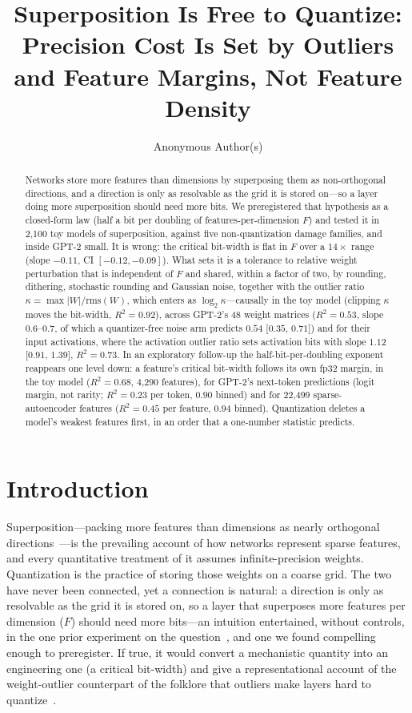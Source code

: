 \documentclass{article}
\title{Superposition Is Free to Quantize: Precision Cost Is Set by Outliers and Feature Margins, Not Feature Density}
\author{Anonymous Author(s)}
\begin{document}
\maketitle

\begin{abstract}
Networks store more features than dimensions by superposing them as non-orthogonal directions, and a direction is only
as resolvable as the grid it is stored on---so a layer doing more superposition should need more bits. We preregistered
that hypothesis as a closed-form law (half a bit per doubling of features-per-dimension $F$) and tested it in 2{,}100
toy models of superposition, against five non-quantization damage families, and inside GPT-2 small. It is wrong:
the critical bit-width is flat in $F$ over a $14\times$ range (slope $-0.11$, CI $[-0.12,-0.09]$). What sets it is a
tolerance to relative weight perturbation that is independent of $F$ and shared, within a factor of two, by rounding,
dithering, stochastic rounding and Gaussian noise, together with the outlier ratio $\kappa=\max|W|/\mathrm{rms}(W)$, which
enters as $\log_2\kappa$---causally in the toy model (clipping $\kappa$ moves the bit-width, $R^2=0.92$), across GPT-2's 48 weight matrices
($R^2=0.53$, slope $0.6$--$0.7$, of which a quantizer-free noise arm predicts $0.54$ [$0.35$, $0.71$]) and for their input
activations, where the activation outlier ratio sets activation bits with slope $1.12$ [$0.91$, $1.39$], $R^2=0.73$. In an exploratory follow-up the half-bit-per-doubling exponent reappears one level down: a feature's critical
bit-width follows its own fp32 margin, in the toy model ($R^2=0.68$, 4{,}290 features), for GPT-2's next-token predictions
(logit margin, not rarity; $R^2 = 0.23$ per token, $0.90$ binned) and for 22{,}499 sparse-autoencoder features ($R^2=0.45$
per feature, $0.94$ binned). Quantization deletes a model's weakest features first, in an order that a one-number
statistic predicts.
\end{abstract}

\section{Introduction}
Superposition---packing more features than dimensions as nearly orthogonal directions~\cite{elhage2022toy}---is the
prevailing account of how networks represent sparse features, and every quantitative treatment of it assumes
infinite-precision weights. Quantization is the practice of storing those weights on a coarse grid. The two have never
been connected, yet a connection is natural: a direction is only as resolvable as the grid it is stored on, so a layer
that superposes more features per dimension ($F$) should need more bits---an intuition entertained, without controls, in
the one prior experiment on the question~\cite{bitnets}, and one we found compelling enough to preregister. If true, it
would convert a mechanistic quantity into an engineering one (a critical bit-width) and give a representational account
of the weight-outlier counterpart of the folklore that outliers make layers hard to quantize~\cite{dettmers2022,xiao2023,lin2024awq}.
\end{document}
